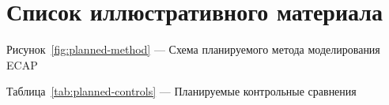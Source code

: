 \chapter*{Список иллюстративного материала}
\noindent Рисунок~\ref{fig:planned-method} — Схема планируемого метода моделирования ECAP\dotfill\pageref{fig:planned-method}\par
\noindent Таблица~\ref{tab:planned-controls} — Планируемые контрольные сравнения\dotfill\pageref{tab:planned-controls}\par
